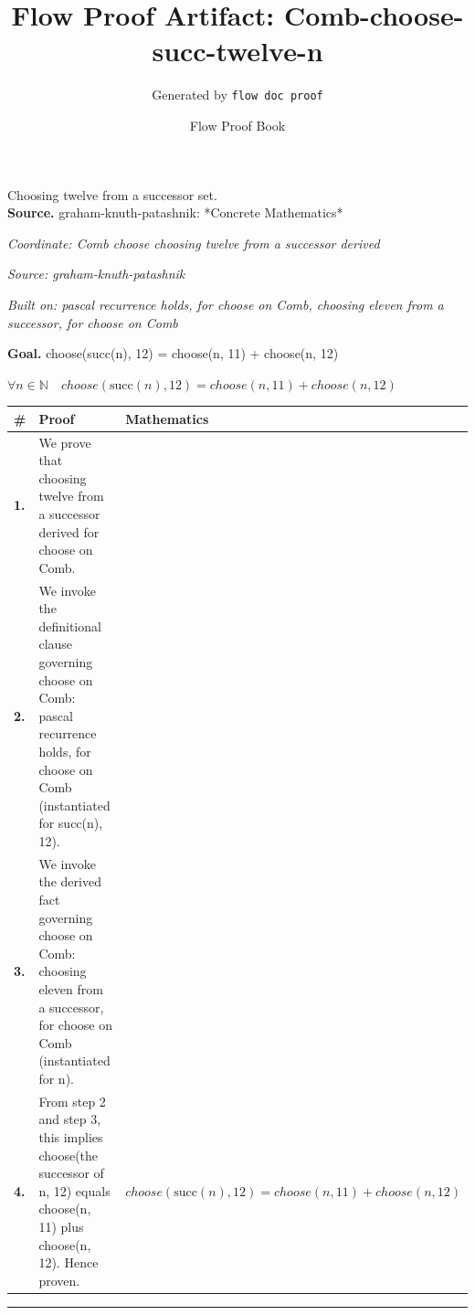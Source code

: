 \documentclass[11pt]{article}
\title{Flow Proof Artifact: Comb-choose-succ-twelve-n}
\author{Generated by \texttt{flow doc proof}}
\date{Flow Proof Book}
\theoremstyle{definition}
\begin{document}
\maketitle
Choosing twelve from a successor set.\\[0.5em]
\textbf{Source.} graham-knuth-patashnik: *Concrete Mathematics*\\[0.5em]
\bigskip
{}\par
\smallskip\noindent\textit{Coordinate: Comb \cdot choose \cdot choosing twelve from a successor derived}\par
\smallskip\noindent\textit{Source: graham-knuth-patashnik}\par
\smallskip\noindent\textit{Built on: pascal recurrence holds, for choose on Comb, choosing eleven from a successor, for choose on Comb}\par
\medskip
\noindent\textbf{Goal.} choose(succ(n), 12) = choose(n, 11) + choose(n, 12)\par
\noindent$\displaystyle \forall n \in \mathbb{N}\quad choose(\mathrm{succ}(n), 12) = choose(n, 11) + choose(n, 12)$\par
\medskip
\noindent
\begin{tabular}{@{} >{\raggedright\arraybackslash}p{} >{\raggedright\arraybackslash}p{} >{\raggedleft\arraybackslash}p{} @{}}
\textbf{\#} & \textbf{Proof} & \textbf{Mathematics} \\
\midrule
\textbf{1.} & We prove that choosing twelve from a successor derived for choose on Comb. & \\[0.45em]
\textbf{2.} & We invoke the definitional clause governing choose on Comb: pascal recurrence holds, for choose on Comb (instantiated for succ(n), 12). & \\[0.45em]
\textbf{3.} & We invoke the derived fact governing choose on Comb: choosing eleven from a successor, for choose on Comb (instantiated for n). & \\[0.45em]
\textbf{4.} & From step 2 and step 3, this implies choose(the successor of n, 12) equals choose(n, 11) plus choose(n, 12). Hence proven. & $\displaystyle choose(\mathrm{succ}(n), 12) = choose(n, 11) + choose(n, 12)$ \\[0.45em]
\bottomrule
\end{tabular}
\label{thm:Comb-choose-choosing_twelve_from_a_successor_derived}
\par\medskip\hrule
\end{document}
